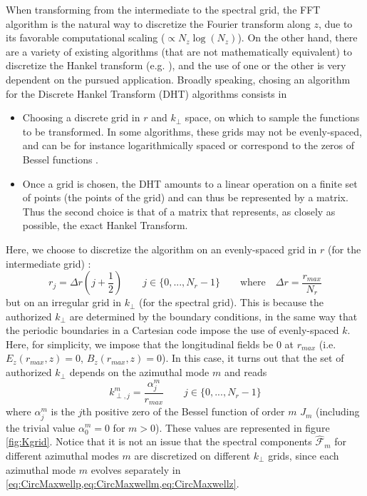 \documentclass[a4paper]{article}   	%
\newcommand{\spectral}[1]{\hat{\mathcal{#1}}}
\begin{document}
When transforming from the intermediate to the spectral grid, the FFT
algorithm is the natural way to discretize the Fourier transform along $z$, due to its
favorable computational scaling ($\propto N_z\log(N_z)$).
On the other hand, there are a variety of existing algorithms (that are not mathematically
equivalent) to discretize the Hankel
transform (e.g. \citep{Cree,Yu,Siegman,Guizar,KaiMing}), and the use of one or the other
is very dependent on the pursued application. Broadly
speaking, chosing an algorithm for the Discrete Hankel Transform (DHT)
algorithms consists in 
\begin{itemize}
\item Choosing a discrete grid in $r$ and $k_\perp$ space, on which to
  sample the functions to be transformed. In some algorithms, these
  grids may not be evenly-spaced, and can be for instance
  logarithmically spaced \citep{Siegman} or correspond to the zeros of
  Bessel functions \citep{Yu,Guizar,KaiMing}.
\item Once a grid is chosen, the DHT amounts to a linear operation on a
  finite set of points (the points of the grid) and can thus be
  represented by a matrix. Thus the second choice is that of a matrix
  that represents, as closely as possible, the exact Hankel Transform.
\end{itemize}
Here, we choose to discretize the algorithm on an evenly-spaced grid in $r$
(for the intermediate grid) :
\[ r_j = \Delta r \left( j+\frac{1}{2} \right) \qquad  j \in \{0, ...,
N_r-1 \} \qquad \mathrm{where} \quad \Delta r = \frac{r_{max}}{N_r} \]
but on an irregular grid in $k_\perp$ (for the spectral grid). This is because the authorized
$k_\perp$ are determined by the boundary conditions, in the same way that
the periodic boundaries in a Cartesian code impose the use of
evenly-spaced $k$. Here, for simplicity, we impose that the
longitudinal fields be $0$ at $r_{max}$ (i.e. $E_z(r_{max}, z) = 0$,
$B_z(r_{max}, z) = 0$). In this case, it turns out that the set of authorized
$k_\perp$ depends on the azimuthal mode $m$ and reads
\[  k^m_{\perp,j} = \frac{\alpha_j^m}{r_{max}} \qquad j \in \{0, ..., N_r-1 \}\]
where $\alpha^m_j$ is the $j$th positive zero of the Bessel function of order
$m$ $J_m$ (including the trivial value $\alpha_0^m=0$ for
$m>0$). These values are represented in figure \ref{fig:Kgrid}. Notice
that it is not an issue that the spectral components $\spectral{F}_m$
for different azimuthal modes $m$ are discretized on different
$k_\perp$ grids, since each azimuthal mode $m$ evolves separately in
\cref{eq:CircMaxwellp,eq:CircMaxwellm,eq:CircMaxwellz}.
\end{document}
